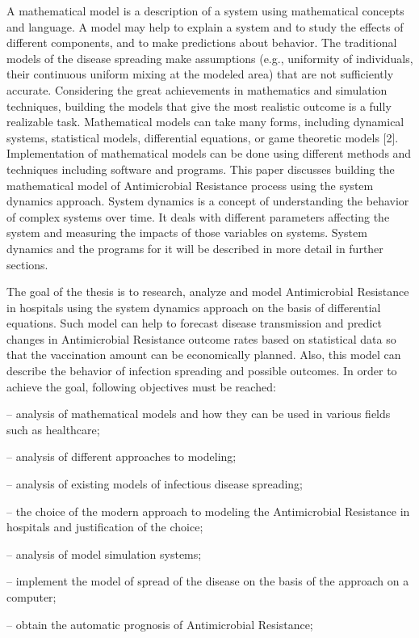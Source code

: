 A mathematical model is a description of a system using mathematical concepts and language. A model may help to explain a system and to study the effects of different components, and to make predictions about behavior. The traditional models of the disease spreading make assumptions (e.g., uniformity of individuals, their continuous uniform mixing at the modeled area) that are not sufficiently accurate. Considering the great achievements in mathematics and simulation techniques, building the models that give the most realistic outcome is a fully realizable task. Mathematical models can take many forms, including dynamical systems, statistical models, differential equations, or game theoretic models [2]. Implementation of mathematical models can be done using different methods and techniques including software and programs. This paper discusses building the mathematical model of Antimicrobial Resistance process using the system dynamics approach. System dynamics is a concept of understanding the behavior of complex systems over time. It deals with different parameters affecting the system and measuring the impacts of those variables on systems. System dynamics and the programs for it will be described in more detail in further sections.

The goal of the thesis is to research, analyze and model Antimicrobial Resistance in hospitals using the system dynamics approach on the basis of differential equations.  Such model can help to forecast disease transmission and predict changes in Antimicrobial Resistance outcome rates based on statistical data so that the vaccination amount can be economically planned. Also, this model can describe the behavior of infection spreading and possible outcomes. In order to achieve the goal, following objectives must be reached:

–	analysis of mathematical models and how they can be used in various fields such as healthcare;

–	analysis of different approaches to modeling;

–	analysis of existing models of infectious disease spreading;

–	the choice of the modern approach to modeling the Antimicrobial Resistance in hospitals and justification of the choice;

–	analysis of model simulation systems;

–	implement the model of spread of the disease on the basis of the approach on a computer;

–	obtain the automatic prognosis of Antimicrobial Resistance;

